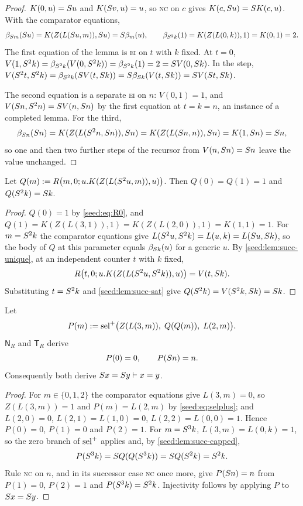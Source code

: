 \begin{proof}
$K(0,u)=S u$ and $K(S v,u)=u$, so \textsc{nc} on $c$ gives
$K(c,S u)=S K(c,u)$. With the comparator equations,
\[
 \beta_{S m}(S u)=K(Z(L(S u,m)),S u)=S\beta_m(u),\qquad
 \beta_{S^2k}(1)=K(Z(L(0,k)),1)=K(0,1)=2 .
\]
The first equation of the lemma is \textsc{ei} on $t$ with $k$ fixed. At
$t=0$, $V(1,S^2k)=\beta_{S^2k}(V(0,S^2k))=\beta_{S^2k}(1)=2
=S V(0,S k)$. In the step,
$V(S^2t,S^2k)=\beta_{S^2k}(S V(t,S k))
=S\beta_{S k}(V(t,S k))=S V(S t,S k)$.

The second equation is a separate \textsc{ei} on $n$: $V(0,1)=1$, and
$V(S n,S^2n)=S V(n,S n)$ by the first equation at $t=k=n$, an
instance of a completed lemma. For the third,
\[
 \beta_{S n}(S n)=K(Z(L(S^2n,S n)),S n)
 =K(Z(L(S n,n)),S n)=K(1,S n)=S n,
\]
so one and then two further steps of the recursor from $V(n,S n)=S n$
leave the value unchanged.
\end{proof}

\begin{lemma}\label{seed:lem:succ-capped}
Let $Q(m)\mathrel{:=} R\bigl(m,0;u.K(Z(L(S^2u,m)),u)\bigr)$. Then
$Q(0)=Q(1)=1$ and $Q(S^2k)=S k$.
\end{lemma}

\begin{proof}
$Q(0)=1$ by \eqref{seed:eq:R0}, and
$Q(1)=K(Z(L(3,1)),1)=K(Z(L(2,0)),1)=K(1,1)=1$. For $m=S^2k$ the
comparator equations give
$L(S^2u,S^2k)=L(u,k)=L(S u,S k)$, so the body of $Q$ at this
parameter equals $\beta_{S k}(u)$ for a generic $u$. By
\cref{seed:lem:succ-unique}, at an independent counter $t$ with $k$ fixed,
\[
 R\bigl(t,0;u.K(Z(L(S^2u,S^2k)),u)\bigr)=V(t,S k).
\]
Substituting $t=S^2k$ and \cref{seed:lem:succ-sat} give
$Q(S^2k)=V(S^2k,S k)=S k$.
\end{proof}

\begin{theorem}[Predecessor]\label{seed:thm:succ-pred}
Let
\[
 P(m)\mathrel{:=}\operatorname{sel}^{+}\bigl(Z(L(3,m)),\;Q(Q(m)),\;L(2,m)\bigr).
\]
$\mathsf{N}_R$ and $\mathsf{T}_R$ derive
\[
 P(0)=0,\qquad P(S n)=n .
\]
Consequently both derive $S x=S y\vdash x=y$.
\end{theorem}

\begin{proof}
For $m\in\{0,1,2\}$ the comparator equations give $L(3,m)=0$, so
$Z(L(3,m))=1$ and $P(m)=L(2,m)$ by \eqref{seed:eq:selplus}; and
$L(2,0)=0$, $L(2,1)=L(1,0)=0$, $L(2,2)=L(0,0)=1$. Hence $P(0)=0$,
$P(1)=0$ and $P(2)=1$. For $m=S^3k$, $L(3,m)=L(0,k)=1$, so the zero branch
of $\operatorname{sel}^{+}$ applies and, by \cref{seed:lem:succ-capped},
\[
 P(S^3k)=S Q(Q(S^3k))=S Q(S^2k)=S^2k .
\]
Rule \textsc{nc} on $n$, and in its successor case \textsc{nc} once more,
give $P(S n)=n$ from $P(1)=0$, $P(2)=1$ and $P(S^3k)=S^2k$.
Injectivity follows by applying $P$ to $S x=S y$.
\end{proof}

